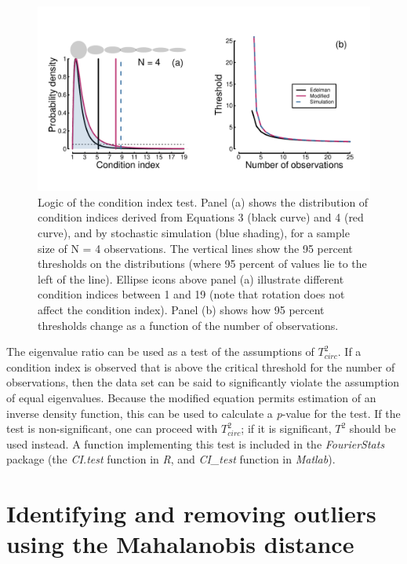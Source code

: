 \documentclass[]{article}
\begin{document}
\begin{figure}

{\centering \includegraphics{figures/distcomparison} 

}

\caption{Logic of the condition index test. Panel (a) shows the distribution of condition indices derived from Equations 3 (black curve) and 4 (red curve), and by stochastic simulation (blue shading), for a sample size of N = 4 observations. The vertical lines show the 95 percent thresholds on the distributions (where 95 percent of values lie to the left of the line). Ellipse icons above panel (a) illustrate different condition indices between 1 and 19 (note that rotation does not affect the condition index). Panel (b) shows how 95 percent thresholds change as a function of the number of observations.}\label{fig:distcomparison}
\end{figure}

The eigenvalue ratio can be used as a test of the assumptions of \(T^2_{circ}\). If a condition index is observed that is above the critical threshold for the number of observations, then the data set can be said to significantly violate the assumption of equal eigenvalues. Because the modified equation permits estimation of an inverse density function, this can be used to calculate a \emph{p}-value for the test. If the test is non-significant, one can proceed with \(T^2_{circ}\); if it is significant, \(T^2\) should be used instead. A function implementing this test is included in the \emph{FourierStats} package (the \emph{CI.test} function in \emph{R}, and \emph{CI\_test} function in \emph{Matlab}).

\hypertarget{identifying-and-removing-outliers-using-the-mahalanobis-distance}{%
\section{Identifying and removing outliers using the Mahalanobis distance}\label{identifying-and-removing-outliers-using-the-mahalanobis-distance}}
\end{document}

